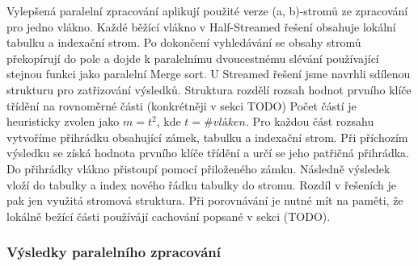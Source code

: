 Vylepšená paralelní zpracování aplikují použité verze (a, b)-stromů ze zpracování pro jedno vlákno. 
Každé běžící vlákno v Half-Streamed řešení obsahuje lokální tabulku a indexační strom. 
Po dokončení vyhledávání se obsahy stromů překopírují do pole a dojde k paralelnímu dvoucestnému slévání používající stejnou funkci jako paralelní Merge sort. 
U Streamed řešení jsme navrhli sdílenou strukturu pro zatřizování výsledků.
Struktura rozdělí rozsah hodnot prvního klíče třídění na rovnoměrné části (konkrétněji v sekci TODO)
Počet částí je heuristicky zvolen jako $m=t^2$, kde $t=\#vláken$. 
Pro každou část rozsahu vytvoříme přihrádku obsahující zámek, tabulku a indexační strom.
Při příchozím výsledku se získá hodnota prvního klíče třídění a určí se jeho patřičná přihrádka. 
Do přihrádky vlákno přistoupí pomocí přiloženého zámku.
Následně výsledek vloží do tabulky a index nového řádku tabulky do stromu.
Rozdíl v řešeních je pak jen využitá stromová struktura.
Při porovnávání je nutné mít na paměti, že lokálně bežící části používájí cachování popsané v sekci (TODO).  

\subsubsection{Výsledky paralelního zpracování}

